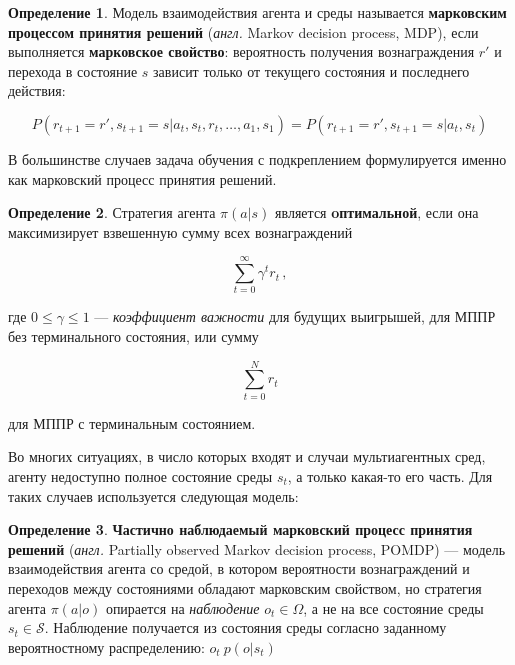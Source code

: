 \documentclass[specification,annotation,times]{itmo-student-thesis}
\theoremstyle{definition}
\newtheorem{definition-ru}{Определение}
\begin{document}
\begin{definition-ru}
  Модель взаимодействия агента и среды называется \textbf{марковским процессом
    принятия решений} (\textit{англ.} Markov decision process, MDP), если
  выполняется \textbf{марковское свойство}:
  вероятность получения вознаграждения $r'$ и перехода в состояние $s$ зависит
  только от текущего состояния и последнего действия:

  \begin{equation}
    P(r_{t+1} = r', s_{t+1} = s | a_t, s_t, r_t, \ldots, a_1,
    s_1) = P(r_{t+1} = r', s_{t+1} = s | a_t, s_t)
  \end{equation}
\end{definition-ru}

В большинстве случаев задача обучения с подкреплением формулируется именно как
марковский процесс принятия решений.

\begin{definition-ru}
  Стратегия агента $\pi(a | s)$ является \textbf{oптимальной}, если она
  максимизирует взвешенную сумму всех вознаграждений

  \begin{equation}\label{eq:reward-sum}
    \sum\limits_{t=0}^{\infty} {\gamma^t r_t} \,,
  \end{equation}

  где $0 \leqslant \gamma \leqslant 1$ --- \textit{коэффициент важности} для
  будущих выигрышей, для МППР без терминального состояния, или сумму

  \begin{equation}
    \sum\limits_{t=0}^{N} {r_t}
  \end{equation}

  для МППР с терминальным состоянием.
\end{definition-ru}

Во многих ситуациях, в число которых входят и случаи мультиагентных сред, агенту
недоступно полное состояние среды $s_t$, а только какая-то его часть. Для таких
случаев используется следующая модель:

\begin{definition-ru}
  \textbf{Частично наблюдаемый марковский процесс принятия решений}
  (\textit{англ.} Partially observed Markov decision process, POMDP) --- модель
  взаимодействия агента со средой, в котором вероятности вознаграждений и
  переходов между состояниями обладают марковским свойством, но стратегия агента
  $\pi(a | o)$ опирается на \textit{наблюдение} $o_t \in \Omega$, а не
  на все состояние среды $s_t \in \mathcal{S}$. Наблюдение получается из
  состояния среды согласно заданному вероятностному распределению:
  $o_t ~ p(o | s_t)$
\end{definition-ru}
\end{document}
